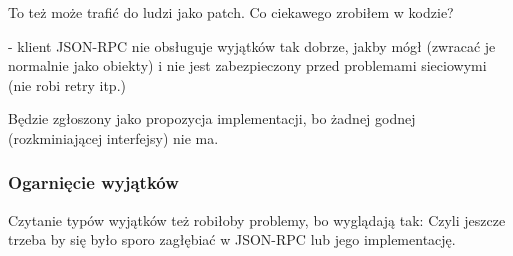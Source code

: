 To też może trafić do ludzi jako patch.
Co ciekawego zrobiłem w kodzie?

- klient JSON-RPC nie obsługuje wyjątków tak dobrze, jakby mógł (zwracać je normalnie jako obiekty) i nie jest zabezpieczony przed problemami sieciowymi (nie robi retry itp.)

Będzie zgłoszony jako propozycja implementacji, bo żadnej godnej (rozkminiającej interfejsy) nie ma.

\subsubsection{Ogarnięcie wyjątków}
Czytanie typów wyjątków też robiłoby problemy, bo wyglądają tak:
Czyli jeszcze trzeba by się było sporo zagłębiać w JSON-RPC lub jego implementację.



%
%
%
